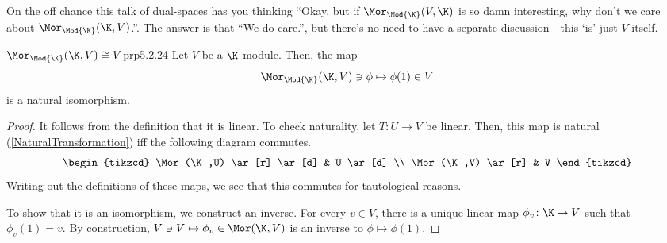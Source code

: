 On the off chance this talk of dual-spaces has you thinking ``Okay, but if $\Mor _{\Mod{\K}}(V,\K )$ is so damn interesting, why don't we care about $\Mor _{\Mod{\K}}(\K ,V)$.''.  The answer is that ``We do care.'', but there's no need to have a separate discussion---this `is' just $V$ itself.
\begin{prp}{$\Mor _{\Mod{\K}}(\K ,V)\cong V$}{prp5.2.24}
	Let $V$ be a $\K$-module.  Then, the map
	\begin{equation}
		\Mor _{\Mod{\K}}(\K ,V)\ni \phi \mapsto \phi (1)\in V
	\end{equation}
	is a natural isomorphism.
	\begin{proof}
		It follows from the definition that it is linear.  To check naturality, let $T\colon U\rightarrow V$ be linear.  Then, this map is natural (\cref{NaturalTransformation}) iff the following diagram commutes.
		\begin{equation}
			\begin{tikzcd}
				\Mor (\K ,U) \ar[r] \ar[d] & U \ar[d] \\
				\Mor (\K ,V) \ar[r] & V
			\end{tikzcd}
		\end{equation}
		Writing out the definitions of these maps, we see that this commutes for tautological reasons.
		
		To show that it is an isomorphism, we construct an inverse.  For every $v\in V$, there is a unique linear map $\phi _v\colon \K \rightarrow V$ such that $\phi _v(1)=v$.  By construction, $V\ni V\mapsto \phi _v\in \Mor (\K ,V)$ is an inverse to $\phi \mapsto \phi (1)$.
	\end{proof}
\end{prp}

